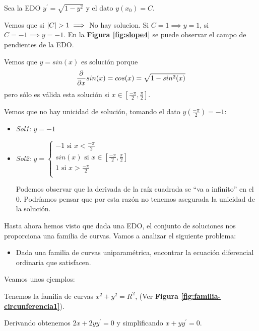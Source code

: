 \documentclass{mathnotes}
\begin{document}
\begin{example}
Sea la EDO $y^\prime = \sqrt{1-y^2}$ y el dato $y(x_0)=C$.

Vemos que si $|C| > 1 \implies$ No hay solucion. Si $C = 1 \implies y = 1$, si $C = -1 \implies y = -1$. En la \textbf{Figura \ref{fig:slope4}} se puede observar el campo de pendientes de la EDO.

Vemos que $y=sin(x)$ es solución porque
$$\frac{\partial}{\partial x}sin(x)=cos(x)=\sqrt{1-sin^2(x)}$$
pero sólo es válida esta solución si $x\in[\frac{-\pi}{2}, \frac{\pi}{2}]$.

Vemos que no hay unicidad de solución, tomando el dato $y(\frac{-\pi}{2}) = -1:$
\begin{itemize}
\item \textit{Sol1: } $y=-1$
\item \textit{Sol2: } 
$
  y=
  \left\lbrace
  \begin{array}{l}
     -1 \text{ si } x \lt \frac{-\pi}{2} \\
     sin(x) \text{ si } x\in[\frac{-\pi}{2}, \frac{\pi}{2}] \\
     1 \text{ si } x \gt \frac{-\pi}{2} \\
  \end{array}
  \right.
$

Podemos observar que la derivada de la raíz cuadrada se ``va a infinito'' en el $0$. Podríamos pensar que por esta razón no tenemos asegurada la unicidad de la solución.
\end{itemize}
\end{example}

Hasta ahora hemos visto que dada una EDO, el conjunto de soluciones nos proporciona una familia de curvas.
Vamos a analizar el siguiente problema:
\begin{itemize}
\item Dada una familia de curvas uniparamétrica, encontrar la ecuación diferencial ordinaria que satisfacen.
\end{itemize}

Veamos unos ejemplos:

\begin{example}
Tenemos la familia de curvas $x^2+y^2=R^2$, (Ver \textbf{Figura \ref{fig:familia-circunferencia1}}).

Derivando obtenemos $2x+2yy^\prime = 0$ y simplificando $x+yy^\prime = 0$.
\end{example}
\end{document}
